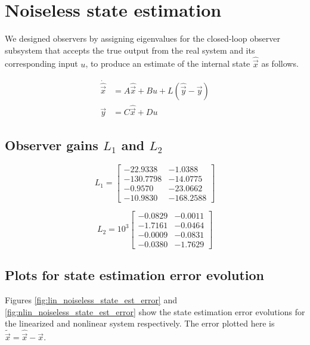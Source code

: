 \documentclass[10pt]{article}
\begin{document}
\section{Noiseless state estimation}

We designed observers by assigning eigenvalues for the closed-loop observer subsystem that accepts the true output from the real system and its corresponding input $u$, to produce an estimate of the internal state $\hat{\vec{x}}$ as follows.

\begin{align*}
    \dot{\hat{\vec{x}}} &= A\hat{\vec{x}} + Bu + L(\hat{\vec{y}}-\vec{y})\\
    \vec{y} &= C\hat{\vec{x}} + Du
\end{align*}

\subsection{Observer gains \texorpdfstring{$L_1$}{L1} and \texorpdfstring{$L_2$}{L2}}

\begin{equation*}
    L_1 = \begin{bmatrix}
    -22.9338 & -1.0388 \\
    -130.7798 & -14.0775 \\ 
    -0.9570 & -23.0662 \\ 
    -10.9830 & -168.2588
    \end{bmatrix}
\end{equation*}

\begin{equation*}
    L_2 = 10^{3} \begin{bmatrix}
    -0.0829  & -0.0011 \\
    -1.7161  & -0.0464 \\ 
    -0.0009  & -0.0831 \\ 
    -0.0380  & -1.7629
    \end{bmatrix}
\end{equation*}

\subsection{Plots for state estimation error evolution}
Figures \ref{fig:lin_noiseless_state_est_error} and \ref{fig:nlin_noiseless_state_est_error} show the state estimation error evolutions for the linearized and nonlinear system respectively. The error plotted here is $\tilde{\vec{x}} = \hat{\vec{x}} - \vec{x}$.
\end{document}
